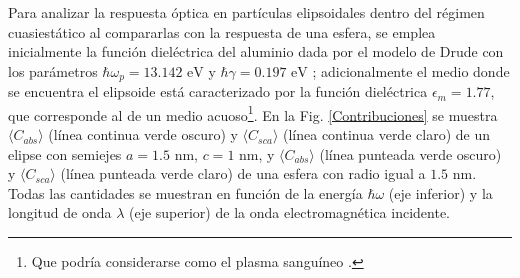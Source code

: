 Para analizar la respuesta óptica en partículas elipsoidales dentro del régimen cuasiestático al compararlas con la respuesta de una esfera, se emplea inicialmente la función dieléctrica del aluminio dada por el modelo de Drude con los parámetros $\hbar\omega_p=13.142\text{ eV}$ y $\hbar\gamma=0.197\text{ eV}$ \cite{Aluminio}; adicionalmente el medio donde se encuentra el elipsoide está caracterizado por la función dieléctrica $\epsilon_m = 1.77$, que corresponde al de un medio acuoso\footnote{Que podría considerarse como el plasma sanguíneo \cite{Blood}.}. En la Fig. \ref{Contribuciones} se muestra $\langle C_{abs} \rangle$ (línea continua verde oscuro) y $\langle C_{sca} \rangle$ (línea continua verde claro) de  un elipse con semiejes $a=1.5\text{ nm}$, $c=1\text{ nm}$, y $\langle C_{abs} \rangle$ (línea punteada verde oscuro) y $\langle C_{sca} \rangle$ (línea punteada verde claro) de una esfera con radio igual a $1.5\text{ nm}$. Todas las cantidades se muestran
en función de la energía $\hbar\omega$ (eje inferior) y la longitud de onda $\lambda$ (eje superior) de la onda electromagnética incidente. \\
